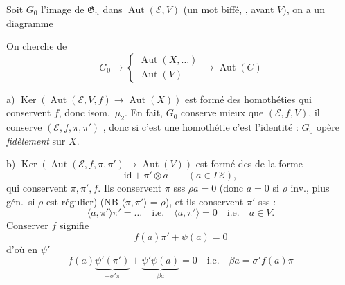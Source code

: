\documentclass[11pt,a4paper]{article}
\begin{document}
Soit $G_0$ l'image de $\mathfrak{G}_n$ dans
$\operatorname{Aut}(\mathcal{E}, V)$ (un mot biffé, \ill{}, avant $V$), on a un diagramme



On cherche \struck{\ill{}}  de
\[
G_0 \longrightarrow
\left\lbrace
\begin{array}{l}
\operatorname{Aut}(X, \ldots) \\
\operatorname{Aut}(V)
\end{array}
\right.
\longrightarrow \operatorname{Aut}(C)
\]

a) $\operatorname{Ker}(\operatorname{Aut}(\mathcal{E}, V, f) \to
\operatorname{Aut}(X))$ est formé des homothéties qui conservent $f$, donc
isom.\ $\mu_2$. En fait, $G_0$ conserve mieux que $(\mathcal{E}, f, V)$, il
conserve $(\mathcal{E}, f, \pi, \pi')$ , donc si c'est une
homothétie c'est l'identité : $G_0$ opère \emph{fidèlement} sur $X$.

b) $\operatorname{Ker}(\operatorname{Aut}(\mathcal{E}, f, \pi, \pi') \to
\operatorname{Aut}(V))$ est formé des \ill{} \ill{} de la forme
\[
\mathrm{id} + \pi' \otimes a \qquad (a \in \Gamma \mathcal{E}),
\]
qui conservent $\pi, \pi', f$. Ils conservent $\pi$ sss \struck{\ill{}}
$\rho a = 0$ (donc $a = 0$ si $\rho$ inv., plus gén.\ si $\rho$ est régulier)
(NB $\langle \pi, \pi' \rangle = \rho$), et ils conservent $\pi'$ sss :
\[
\langle a, \pi' \rangle \pi' = \ldots
\quad \text{i.e.} \quad \langle a, \pi' \rangle = 0
\quad \text{i.e.} \quad \boxed{a \in V.}
\]
Conserver $f$ signifie
\[
f(a)\pi' + \psi(a) = 0
\]
d'où \struck{\ill{}} en \ill{} $\psi'$
\[
f(a) \underbrace{\psi'(\pi')}_{-\sigma' \pi} +
\underbrace{\psi' \psi(a)}_{\beta a} = 0
\quad \text{i.e.} \quad \beta a = \sigma' f(a) \pi
\]
\end{document}
